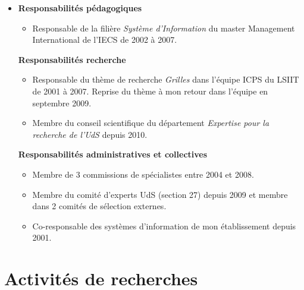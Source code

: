 \documentclass[11pt]{article}
\begin{document}
\begin{itemize}
\item
 	\textbf{Responsabilités pédagogiques}
	\begin{itemize}
		\item Responsable de la filière \textit{Système d'Information} du master Management International de l'IECS de 2002 à 2007.
	\end{itemize}
 	\textbf{Responsabilités recherche}
	\begin{itemize}
		\item Responsable du thème de recherche \textit{Grilles} dans l'équipe ICPS du LSIIT de 2001 à 2007. 
			Reprise du thème à mon retour dans l'équipe en septembre 2009.
		\item Membre du conseil scientifique du département \emph{Expertise pour la recherche de l'UdS} depuis 2010.
	\end{itemize}
 	\textbf{Responsabilités administratives et collectives}
	\begin{itemize}
		\item Membre de 3 commissions de spécialistes entre 2004 et 2008.
		\item Membre du comité d'experts UdS (section 27) depuis 2009 et membre dans 2 comités de sélection externes.
	      \item Co-responsable des systèmes d'information de mon établissement depuis 2001.
	\end{itemize}
\end{itemize}




\newpage
\section{Activités de recherches}
\end{document}
